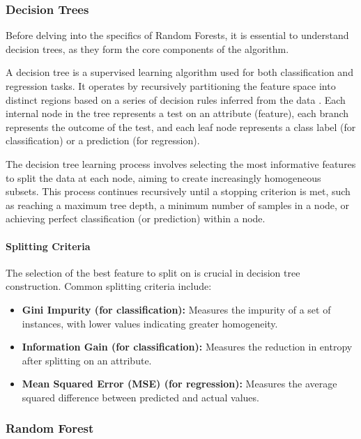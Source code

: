 \subsubsection{Decision Trees}

Before delving into the specifics of Random Forests, it is essential to understand decision trees, as they form the core components of the algorithm.

A decision tree is a supervised learning algorithm used for both classification and regression tasks.
It operates by recursively partitioning the feature space into distinct regions based on a series of decision rules inferred from the data \cite{quinlan1986induction}.
Each internal node in the tree represents a test on an attribute (feature), each branch represents the outcome of the test, and each leaf node represents a class label (for classification) or a prediction (for regression).

The decision tree learning process involves selecting the most informative features to split the data at each node, aiming to create increasingly homogeneous subsets.
This process continues recursively until a stopping criterion is met, such as reaching a maximum tree depth, a minimum number of samples in a node, or achieving perfect classification (or prediction) within a node.

\paragraph{Splitting Criteria}

The selection of the best feature to split on is crucial in decision tree construction.
Common splitting criteria include:

\begin{itemize}
    \item \textbf{Gini Impurity (for classification):} Measures the impurity of a set of instances, with lower values indicating greater homogeneity.
    \item \textbf{Information Gain (for classification):} Measures the reduction in entropy after splitting on an attribute.
    \item \textbf{Mean Squared Error (MSE) (for regression):} Measures the average squared difference between predicted and actual values.
\end{itemize}

\subsubsection{Random Forest}

